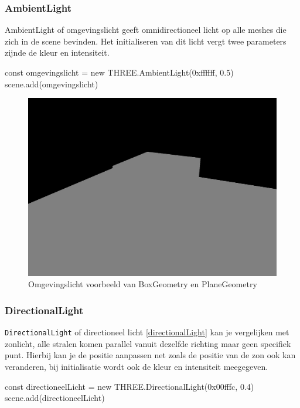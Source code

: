 \subsubsection{AmbientLight}

AmbientLight of omgevingslicht geeft omnidirectioneel licht op alle meshes die zich in de scene bevinden. Het initialiseren van dit licht vergt twee parameters zijnde de kleur en intensiteit.

\begin{LVerbatim}
const omgevingslicht = new THREE.AmbientLight(0xffffff, 0.5)
scene.add(omgevingslicht)
\end{LVerbatim}

\begin{figure}
	\centering
	\includegraphics[width=1\linewidth]{graphics/ambientLight}
	\caption[Omgevingslicht voorbeeld van BoxGeometry en PlaneGeometry]{Omgevingslicht voorbeeld van BoxGeometry en PlaneGeometry}
	\label{fig:ambientLight}
\end{figure}

\subsubsection{DirectionalLight}

\texttt{DirectionalLight} of directioneel licht \ref{directionalLight} kan je vergelijken met zonlicht, alle stralen komen parallel vanuit dezelfde richting maar geen specifiek punt. Hierbij kan je de positie aanpassen net zoals de positie van de zon ook kan veranderen, bij initialisatie wordt ook de kleur en intensiteit meegegeven.

\begin{LVerbatim}
const directioneelLicht = new THREE.DirectionalLight(0x00fffc, 0.4)
scene.add(directioneelLicht)
\end{LVerbatim}

